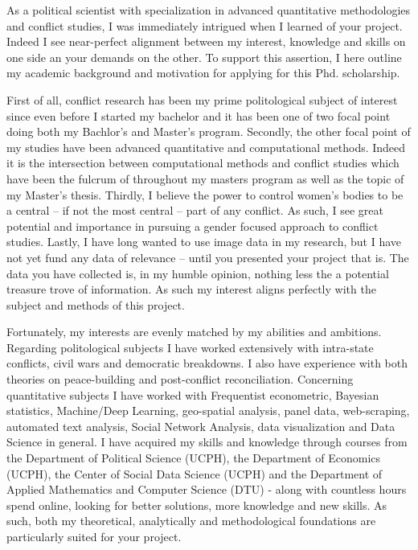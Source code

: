 \documentclass[a4paper]{article}
\begin{document}

As a political scientist with specialization in advanced quantitative methodologies and conflict studies, I was immediately intrigued when I learned of your project. Indeed I see near-perfect alignment between my interest, knowledge and skills on one side an your demands on the other. To support this assertion, I here outline my academic background and motivation for applying for this Phd. scholarship.\par

First of all, conflict research has been my prime politological subject of interest since even before I started my bachelor and it has been one of two focal point doing both my Bachlor's and Master's program. Secondly, the other focal point of my studies have been advanced quantitative and computational methods. Indeed it is the intersection between computational methods and conflict studies which have been the fulcrum of throughout my masters program as well as the topic of my Master's thesis. Thirdly, I believe the power to control women's bodies to be a central -- if not the most central -- part of any conflict. As such, I see great potential and importance in pursuing a gender focused approach to conflict studies. Lastly, I have long wanted to use image data in my research, but I have not yet fund any data of relevance -- until you presented your project that is. The data you have collected is, in my humble opinion, nothing less the a potential treasure trove of information. As such my interest aligns perfectly with the subject and methods of this project.\par

Fortunately, my interests are evenly matched by my abilities and ambitions. Regarding politological subjects I have worked extensively with intra-state conflicts, civil wars and democratic breakdowns. I also have experience with both theories on peace-building and post-conflict reconciliation. Concerning quantitative subjects I have worked with Frequentist econometric, Bayesian statistics, Machine/Deep Learning, geo-spatial analysis, panel data, web-scraping, automated text analysis, Social Network Analysis, data visualization and Data Science in general. I have acquired my skills and knowledge through courses from the Department of Political Science (UCPH), the Department of Economics (UCPH), the Center of Social Data Science (UCPH) and the Department of Applied Mathematics and Computer Science (DTU) - along with countless hours spend online, looking for better solutions, more knowledge and new skills. As such, both my theoretical, analytically and methodological foundations are particularly suited for your project.\par %
\end{document}
